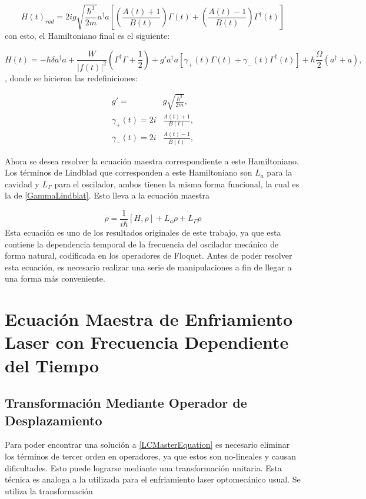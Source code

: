 \documentclass[a4paper,10pt]{report}
\begin{document}
\begin{equation}
H(t)_{rad} = 2ig\sqrt{\frac{\hbar^3}{2m}}  a^\dagger a[(\frac{A(t) +1}{B(t)})\Gamma (t) +(\frac{A(t) -1}{B(t)})\Gamma^\dagger (t)]
\end{equation} con esto, el Hamiltoniano final es el siguiente:

\begin{equation}\label{LaserCoolingHamiltonian}
H(t) = -\hbar \delta a^\dagger a + \frac{W}{|f(t)|^2}(\Gamma^\dagger \Gamma + \frac{1}{2}) +  g'a^\dagger a[\gamma_+(t)\Gamma (t) +\gamma_-(t)\Gamma^\dagger (t)] + \hbar\frac{\Omega}{2}(a^\dagger + a),
\end{equation}, donde se hicieron las redefiniciones:

\begin{align*}
g'=&g\sqrt{\frac{\hbar^3}{2m}},\\
\gamma_+(t)=2i&\frac{A(t) +1}{B(t)},\\
\gamma_-(t)=2i&\frac{A(t) -1}{B(t)},
\end{align*} 

Ahora se desea resolver la ecuación maestra correspondiente a este Hamiltoniano. Los términos de Lindblad que corresponden a este Hamiltoniano son $L_a$ para la cavidad y $L_\Gamma$ para el oscilador, ambos tienen la misma forma funcional, la cual es la de \ref{GammaLindblat}. Esto lleva a la ecuación maestra

\begin{equation}\label{LCMasterEquation}
\dot{\rho} = \frac{1}{i\hbar}[H,\rho] + L_a\rho + L_\Gamma \rho
\end{equation}Esta ecuación es uno de los resultados originales de este trabajo, ya que esta contiene la dependencia temporal de la frecuencia del oscilador mecánico de forma natural, codificada en los operadores de Floquet. Antes de poder resolver esta ecuación, es necesario realizar una serie de manipulaciones a fin de llegar a una forma más conveniente.

\chapter{Ecuación Maestra de Enfriamiento Laser con Frecuencia Dependiente del Tiempo}

\section{Transformación Mediante Operador de Desplazamiento}

Para poder encontrar una solución a \ref{LCMasterEquation} es necesario eliminar los términos de tercer orden en operadores, ya que estos son no-lineales y causan dificultades. Esto puede lograrse mediante una transformación unitaria. Esta técnica es analoga a la utilizada para el enfriamiento laser optomecánico usual. Se utiliza la transformación
\end{document}

